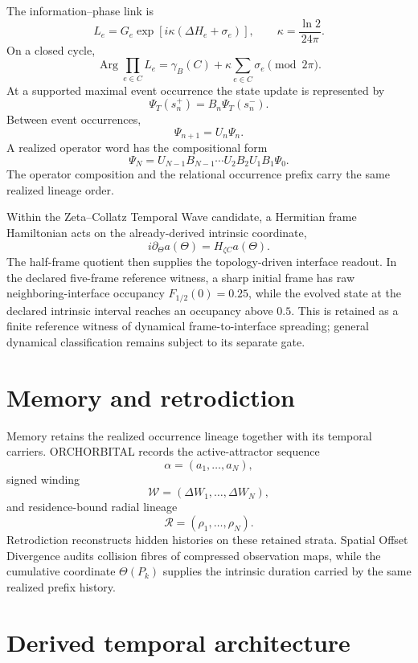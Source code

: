 The information--phase link is
\[
L_e
=G_e\exp\!\left[i\kappa(\Delta H_e+\sigma_e)\right],
\qquad
\boxed{\kappa=\frac{\ln2}{24\pi}}.
\]
On a closed cycle,
\[
\boxed{
\operatorname{Arg}\prod_{e\in C}L_e
=\gamma_B(C)+\kappa\sum_{e\in C}\sigma_e
\pmod{2\pi}.
}
\]
At a supported maximal event occurrence the state update is represented by
\[
\boxed{
\Psi_T(s_n^+)=B_n\Psi_T(s_n^-).
}
\]
Between event occurrences,
\[
\boxed{\Psi_{n+1}=U_n\Psi_n.}
\]
A realized operator word has the compositional form
\[
\boxed{
\Psi_N
=U_{N-1}B_{N-1}\cdots U_2B_2U_1B_1\Psi_0.
}
\]
The operator composition and the relational occurrence prefix carry the same realized lineage order.

Within the Zeta--Collatz Temporal Wave candidate, a Hermitian frame Hamiltonian acts on the already-derived intrinsic coordinate,
\[
\boxed{
i\partial_\Theta a(\Theta)=H_{\zeta C}a(\Theta).
}
\]
The half-frame quotient then supplies the topology-driven interface readout. In the declared five-frame reference witness, a sharp initial frame has raw neighboring-interface occupancy $F_{1/2}(0)=0.25$, while the evolved state at the declared intrinsic interval reaches an occupancy above $0.5$. This is retained as a finite reference witness of dynamical frame-to-interface spreading; general dynamical classification remains subject to its separate gate.

\section{Memory and retrodiction}

Memory retains the realized occurrence lineage together with its temporal carriers. ORCHORBITAL records the active-attractor sequence
\[
\alpha=(a_1,\ldots,a_N),
\]
signed winding
\[
\mathcal W=(\Delta W_1,\ldots,\Delta W_N),
\]
and residence-bound radial lineage
\[
\mathcal R=(\rho_1,\ldots,\rho_N).
\]
Retrodiction reconstructs hidden histories on these retained strata. Spatial Offset Divergence audits collision fibres of compressed observation maps, while the cumulative coordinate $\Theta(P_k)$ supplies the intrinsic duration carried by the same realized prefix history.

\section{Derived temporal architecture}

